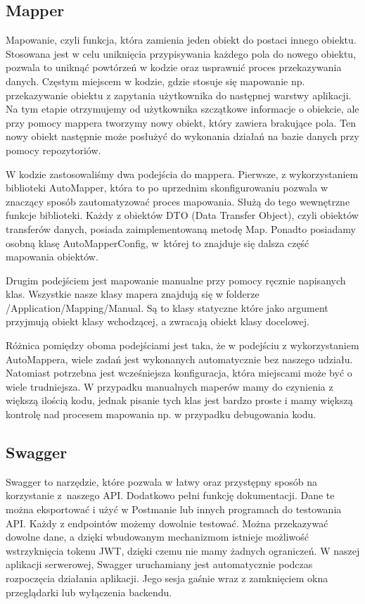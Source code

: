 \documentclass[a4paper,twoside,12pt]{book}
\begin{document}
\subsection{Mapper} 
Mapowanie, czyli funkcja, która zamienia jeden obiekt do postaci innego obiektu. Stosowana jest w celu uniknięcia przypisywania każdego pola do nowego obiektu, pozwala to uniknąć powtórzeń w kodzie oraz usprawnić proces przekazywania danych. Częstym miejscem w kodzie, gdzie stosuje się mapowanie np. przekazywanie obiektu z zapytania użytkownika do następnej warstwy aplikacji. Na tym etapie otrzymujemy od użytkownika szczątkowe informacje o obiekcie, ale przy pomocy mappera tworzymy nowy obiekt, który zawiera brakujące pola. Ten nowy obiekt następnie może posłużyć do wykonania działań na bazie danych przy pomocy repozytoriów.

W kodzie zastosowaliśmy dwa podejścia do mappera. Pierwsze, z wykorzystaniem biblioteki AutoMapper, która to po uprzednim skonfigurowaniu pozwala w znaczący sposób zautomatyzować proces mapowania. Służą do tego wewnętrzne funkcje biblioteki. Każdy z obiektów DTO (Data Transfer Object), czyli obiektów transferów danych, posiada zaimplementowaną metodę Map. Ponadto posiadamy osobną klasę AutoMapperConfig, w~której to znajduje się dalsza część mapowania obiektów.

Drugim podejściem jest mapowanie manualne przy pomocy ręcznie napisanych klas. Wszystkie nasze klasy mapera znajdują się w folderze /Application/Mapping/Manual. Są to klasy statyczne które jako argument przyjmują obiekt klasy wchodzącej, a zwracają obiekt klasy docelowej.

Różnica pomiędzy oboma podejściami jest taka, że w podejściu z wykorzystaniem AutoMappera, wiele zadań jest wykonanych automatycznie bez naszego udziału. Natomiast potrzebna jest wcześniejsza konfiguracja, która miejscami może być o wiele trudniejsza. W przypadku manualnych maperów mamy do czynienia z większą ilością kodu, jednak pisanie tych klas jest bardzo proste i mamy większą kontrolę nad procesem mapowania np. w przypadku debugowania kodu.

\subsection{Swagger}
Swagger to narzędzie, które pozwala w łatwy oraz przystępny sposób na korzystanie z~naszego API. Dodatkowo pełni funkcję dokumentacji. Dane te można eksportować i użyć w Postmanie lub innych programach do testowania API. Każdy z endpointów możemy dowolnie testować. Można przekazywać dowolne dane, a dzięki wbudowanym mechanizmom istnieje możliwość wstrzyknięcia tokenu JWT, dzięki czemu nie mamy żadnych ograniczeń. W naszej aplikacji serwerowej, Swagger uruchamiany jest automatycznie podczas rozpoczęcia działania aplikacji. Jego sesja gaśnie wraz z zamknięciem okna przeglądarki lub wyłączenia backendu.
\end{document}
